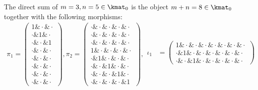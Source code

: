 
\begin{example}
The direct sum of $m = 3, n = 5 \in \kmat_{0}$ is the object $m+n = 8 \in \kmat_{0}$ together with the following morphisms:
\begin{align*}
\pi_{1} = \begin{pmatrix}
1 \ampersand \cdot \ampersand \cdot \\
\cdot \ampersand 1 \ampersand \cdot \\
\cdot \ampersand \cdot \ampersand 1 \\
\cdot \ampersand \cdot \ampersand \cdot \\
\cdot \ampersand \cdot \ampersand \cdot \\
\cdot \ampersand \cdot \ampersand \cdot \\
\cdot \ampersand \cdot \ampersand \cdot \\
\cdot \ampersand \cdot \ampersand \cdot
\end{pmatrix},
\pi_{2} = \begin{pmatrix}
\cdot \ampersand \cdot \ampersand \cdot \ampersand \cdot \ampersand \cdot \\
\cdot \ampersand \cdot \ampersand \cdot \ampersand \cdot \ampersand \cdot \\
\cdot \ampersand \cdot \ampersand \cdot \ampersand \cdot \ampersand \cdot \\
1 \ampersand \cdot \ampersand \cdot \ampersand \cdot \ampersand \cdot \\
\cdot \ampersand 1 \ampersand \cdot \ampersand \cdot \ampersand \cdot \\
\cdot \ampersand \cdot \ampersand 1 \ampersand \cdot \ampersand \cdot \\
\cdot \ampersand \cdot \ampersand \cdot \ampersand 1 \ampersand \cdot \\
\cdot \ampersand \cdot \ampersand \cdot \ampersand \cdot \ampersand 1
\end{pmatrix}, 
\begin{array}{rr}
\iota_{1} &= \begin{pmatrix}
1 \ampersand \cdot \ampersand \cdot \ampersand \cdot \ampersand \cdot \ampersand \cdot \ampersand \cdot \ampersand \cdot \\
\cdot \ampersand 1 \ampersand \cdot \ampersand \cdot \ampersand \cdot \ampersand \cdot \ampersand \cdot \ampersand \cdot \\
\cdot \ampersand \cdot \ampersand 1 \ampersand \cdot \ampersand \cdot \ampersand \cdot \ampersand \cdot \ampersand \cdot
\end{pmatrix} \\

\end{array}
\end{align*}
\end{example}
